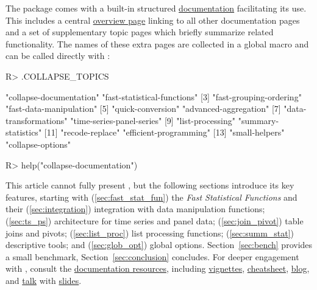 \documentclass[article]{jss} %
\begin{document}
The package comes with a built-in structured \href{https://sebkrantz.github.io/collapse/reference/index.html}{documentation} facilitating its use. This includes a central \href{https://sebkrantz.github.io/collapse/reference/collapse-documentation.html}{overview page} linking to all other documentation pages and a set of supplementary topic pages which briefly summarize related functionality. The names of these extra pages are collected in a global macro  and can be called directly with :
%
\begin{Schunk}
\begin{Sinput}
R> .COLLAPSE_TOPICS
\end{Sinput}
\begin{Soutput}
 [1] "collapse-documentation"     "fast-statistical-functions"
 [3] "fast-grouping-ordering"     "fast-data-manipulation"
 [5] "quick-conversion"           "advanced-aggregation"
 [7] "data-transformations"       "time-series-panel-series"
 [9] "list-processing"            "summary-statistics"
[11] "recode-replace"             "efficient-programming"
[13] "small-helpers"              "collapse-options"
\end{Soutput}
\begin{Sinput}
R> help("collapse-documentation")
\end{Sinput}
\end{Schunk}
%
This article cannot fully present , but the following sections introduce its key features, starting with (\ref{sec:fast_stat_fun}) the \emph{Fast Statistical Functions} and their (\ref{sec:integration}) integration with data manipulation functions; (\ref{sec:ts_ps}) architecture for time series and panel data; (\ref{sec:join_pivot}) table joins and pivots; (\ref{sec:list_proc}) list processing functions; (\ref{sec:summ_stat}) descriptive tools; and (\ref{sec:glob_opt}) global options. Section~\ref{sec:bench} provides a small benchmark, Section~\ref{sec:conclusion} concludes. For deeper engagement with , consult the \href{https://sebkrantz.github.io/collapse/articles/collapse_documentation.html}{documentation resources}, including \href{https://sebkrantz.github.io/collapse/articles/index.html}{vignettes}, \href{https://raw.githubusercontent.com/SebKrantz/collapse/master/misc/collapse\%20cheat\%20sheet/collapse_cheat_sheet.pdf}{cheatsheet}, \href{https://sebkrantz.github.io/Rblog/}{blog}, and \href{https://www.youtube.com/watch?v=OwWT1-dSEts}{talk} with \href{https://raw.githubusercontent.com/SebKrantz/collapse/master/misc/useR2022\%20presentation/collapse_useR2022_final.pdf}{slides}.
%
\end{document}
